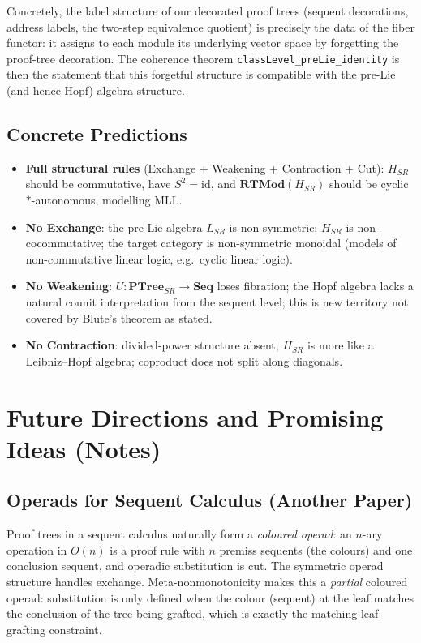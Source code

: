 \documentclass[a4paper,11pt]{report}
\begin{document}
Concretely, the label structure of our decorated proof trees (sequent decorations,
address labels, the two-step equivalence quotient) is precisely the data of the
fiber functor: it assigns to each module its underlying vector space by forgetting
the proof-tree decoration. The coherence theorem \texttt{classLevel\_preLie\_identity}
is then the statement that this forgetful structure is compatible with the pre-Lie
(and hence Hopf) algebra structure.

\subsection*{Concrete Predictions}

\begin{itemize}
  \item \textbf{Full structural rules} (Exchange + Weakening + Contraction + Cut):
    $H_{SR}$ should be commutative, have $S^2 = \mathrm{id}$, and
    $\mathbf{RTMod}(H_{SR})$ should be cyclic $*$-autonomous, modelling MLL.
  \item \textbf{No Exchange}: the pre-Lie algebra $L_{SR}$ is non-symmetric;
    $H_{SR}$ is non-cocommutative; the target category is non-symmetric monoidal
    (models of non-commutative linear logic, e.g.\ cyclic linear logic).
  \item \textbf{No Weakening}: $U \colon \mathbf{PTree}_{SR} \to \mathbf{Seq}$ loses
    fibration; the Hopf algebra lacks a natural counit interpretation from the
    sequent level; this is new territory not covered by Blute's theorem as stated.
  \item \textbf{No Contraction}: divided-power structure absent; $H_{SR}$ is
    more like a Leibniz--Hopf algebra; coproduct does not split along diagonals.
\end{itemize}



\section*{Future Directions and Promising Ideas (Notes)}

\subsection*{Operads for Sequent Calculus (Another Paper)}

Proof trees in a sequent calculus naturally form a \emph{coloured operad}: an $n$-ary
operation in $O(n)$ is a proof rule with $n$ premiss sequents (the colours) and one
conclusion sequent, and operadic substitution is cut. The symmetric operad structure
handles exchange. Meta-nonmonotonicity makes this a \emph{partial} coloured operad:
substitution is only defined when the colour (sequent) at the leaf matches the conclusion
of the tree being grafted, which is exactly the matching-leaf grafting constraint.
\end{document}
